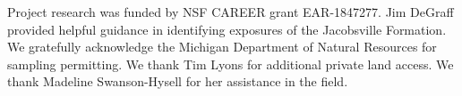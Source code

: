 \documentclass[draft]{agujournal2019}
\begin{document}
\acknowledgments
Project research was funded by NSF CAREER grant EAR-1847277. Jim DeGraff provided helpful guidance in identifying exposures of the Jacobsville Formation. We gratefully acknowledge the Michigan Department of Natural Resources for sampling permitting. We thank Tim Lyons for additional private land access. We thank Madeline Swanson-Hysell for her assistance in the field. 

\nocite{Swanson-Hysell2014a, Swanson-Hysell2014b, Books1972a, Davis1997a, Davis1985a, Denyszyn2009a, Diehl1994a, Eyster2019a, Fairchild2017a, Halls1974a, Hnat2006a, Palmer1986a, Tauxe2009a, Tauxe1991a, Weil2003a}

\end{document}
